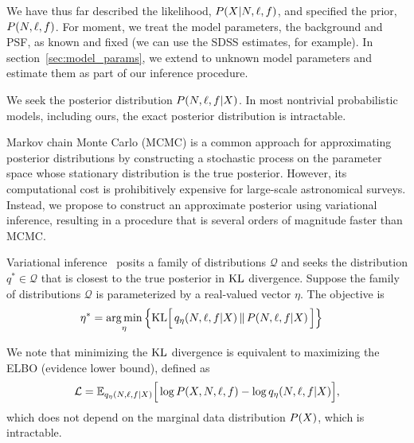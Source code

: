 We have thus far described the likelihood,
$P(X | N, \ell, f)$, and specified the prior, $P(N, \ell, f)$. 
For moment, we treat the model parameters, the background and PSF, as known and fixed
(we can use the SDSS estimates, for example). In section~\ref{sec:model_params}, we extend to unknown 
model parameters and estimate them as part of our inference procedure. 

We seek the posterior distribution 
$P(N, \ell, f | X)$. In most nontrivial probabilistic models, including ours, the exact posterior distribution is intractable.

Markov chain Monte Carlo (MCMC) is a common approach for approximating
posterior distributions by constructing a stochastic process on the parameter space whose stationary distribution is the true posterior.
However, its computational cost is prohibitively expensive for
large-scale astronomical surveys. Instead, we propose to construct an approximate posterior using variational inference, resulting in a procedure that is several orders of magnitude faster than MCMC.

Variational inference~\cite{Blei_2017_vi_review, Jordan_intro_vi, Wainwrite_graph_models_vi}
posits a family of distributions $\mathcal{Q}$ and seeks
the distribution $q^*\in \mathcal{Q}$ that is closest to the true posterior
in $\textrm{KL}$ divergence. Suppose the family of distributions $\mathcal{Q}$ is parameterized by a real-valued vector $\eta$. The objective is 
\begin{align}
   \eta^* &= \operatorname*{arg\,min}_{\eta} \Big\{ \mathrm{KL}\Big[\,q_\eta(N, \ell, f | X)\, \| \,P(N, \ell, f | X )\,\Big]\Big\} 
   \label{eq:kl_objective}
\end{align}

We note that minimizing the $\textrm{KL}$ divergence is equivalent to maximizing the ELBO (evidence lower bound), defined as 
\begin{align}
    \mathcal{L} = 
    \mathbb{E}_{q_\eta(N, \ell, f | X)}\Big[\log P(X, N, \ell, f) - \log q_\eta(N, \ell, f | X)\Big],
    \label{eq:elbo}
\end{align}
which does not depend on the marginal data distribution $P(X)$, which is intractable. 

